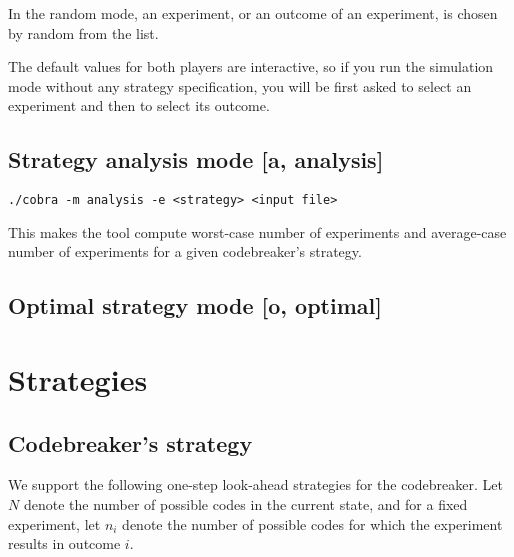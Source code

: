 In the random mode, an experiment, or an outcome of an experiment, is
  chosen by random from the list.

The default values for both players are interactive,
  so if you run the simulation mode without any strategy specification,
  you will be first asked to select an experiment and then to select its outcome.

\subsection{Strategy analysis mode [a, analysis]}

\centerline{\texttt{./cobra -m analysis -e <strategy> <input file> }}

This makes the tool compute worst-case number of experiments and
average-case number of experiments for a given codebreaker's strategy.


\subsection{Optimal strategy mode [o, optimal]}


\section{Strategies}

\subsection{Codebreaker's strategy}

We support the following one-step look-ahead strategies for the codebreaker.
Let $N$ denote the number of possible codes in the current state,
  and for a fixed experiment, let $n_i$ denote the number of possible codes
  for which the experiment results in outcome $i$.

